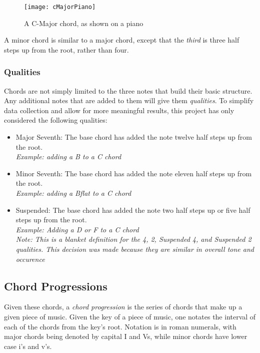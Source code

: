 \documentclass{article}
\begin{document}
		\begin{figure}[htb]
		\texttt{[image: cMajorPiano]}
		\caption{A  C-Major chord, as shown on a piano}
		\end{figure} 

		A minor chord is similar to a major chord, except that the \emph{third} 
		is three half steps up from the root, rather than four.

		\subsubsection{Qualities}
		Chords are not simply limited to the three notes that build their basic 
		structure.  Any additional notes that are added to them will give them 
		\emph{qualities}. To simplify data collection and allow for more meaningful 
		results, this project has only considered the following qualities:

		\begin{itemize}
			\item Major Seventh:  The base chord has added the note twelve half 
				steps up from the root.\\
				\emph{Example:  adding a B to a C chord}
			\item Minor Seventh:  The base chord has added the note eleven half 
				steps up from the root.\\  
				\emph{Example:  adding a Bflat to a C chord}
			\item Suspended:  The base chord has added the note two half steps 
				up or five half steps up from the root. \\  
				\emph{Example:  Adding a D or F to a C chord}\\
				\emph{Note:  This is a blanket definition 
				for the 4, 2, Suspended 4, and Suspended 2 qualities.  This decision 
				was made because they are similar in overall tone and occurence}
		\end{itemize}

	\subsection{Chord Progressions}
	Given these chords, a \emph{chord progression} is the series of chords 
	that make up a given piece of music.  Given the key of a piece of music, 
	one notates the interval of each of the chords from the key's root.  
	Notation is in roman numerals, with major chords being denoted by capital 
	I and Vs, while minor chords have lower case i's and v's.
\end{document}
